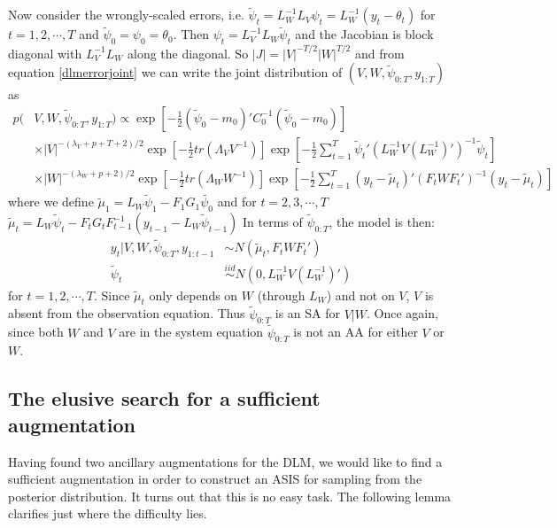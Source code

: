 \documentclass{article}
\begin{document}
Now consider the wrongly-scaled errors, i.e. $\tilde{\psi}_t=L_W^{-1}L_V\psi_t=L_W^{-1}(y_t - \theta_t)$ for $t=1,2,\cdots,T$ and $\tilde{\psi}_0=\psi_0=\theta_0$. Then $\psi_t = L_V^{-1}L_W\tilde{\psi}_t$ and the Jacobian is block diagonal with $L_V^{-1}L_W$ along the diagonal. So $|J|=|V|^{-T/2}|W|^{T/2}$ and from equation \eqref{dlmerrorjoint} we can write the joint distribution of $(V, W, \tilde{\psi}_{0:T}, y_{1:T})$ as
\begin{align}
    p(&V,W,\tilde{\psi}_{0:T},y_{1:T}) \propto \exp\left[-\frac{1}{2}(\tilde{\psi}_0-m_0)'C_0^{-1}(\tilde{\psi}_0-m_0)\right] \nonumber\\
   &\times |V|^{-(\lambda_V + p + T + 2)/2}\exp\left[-\frac{1}{2}tr\left(\Lambda_VV^{-1}\right)\right] \exp\left[-\frac{1}{2}\sum_{t=1}^T\tilde{\psi}_t'(L_W^{-1}V(L_W^{-1})')^{-1}\tilde{\psi}_t\right] \nonumber\\
    & \times |W|^{-(\lambda_W + p + 2)/2}\exp\left[-\frac{1}{2}tr\left(\Lambda_WW^{-1}\right)\right]\exp\left[-\frac{1}{2}\sum_{t=1}^T(y_t - \tilde{\mu}_t)'(F_tWF_t')^{-1}(y_t-\tilde{\mu}_t)\right]\label{dlmerrortildejoint}
 \end{align}
where we define $\tilde{\mu}_1 = L_W\tilde{\psi}_1 - F_1G_1\tilde{\psi_0}$ and for $t=2,3,\cdots,T$ $\tilde{\mu}_t =L_W\tilde{\psi}_t - F_tG_tF_{t-1}^{-1}(y_{t-1} - L_{W}\tilde{\psi}_{t-1})$ In terms of $\tilde{\psi}_{0:T}$, the model is then:
 \begin{align*}
   y_t|V,W,\tilde{\psi}_{0:T},y_{1:t-1} &\sim N(\tilde{\mu}_t, F_tWF_t')\\
   \tilde{\psi}_t & \stackrel{iid}{\sim} N(0,L_W^{-1}V(L_W^{-1})')
\end{align*}
for $t=1,2,\cdots,T$. Since $\tilde{\mu}_t$ only depends on $W$ (through $L_W$) and not on $V$, $V$ is absent from the observation equation. Thus $\tilde{\psi}_{0:T}$ is an SA for $V|W$. Once again, since both $W$ and $V$ are in the system equation $\tilde{\psi}_{0:T}$ is not an AA for either $V$ or $W$.

\subsection{The elusive search for a sufficient augmentation}

Having found two ancillary augmentations for the DLM, we would like to find a sufficient augmentation in order to construct an ASIS for sampling from the posterior distribution. It turns out that this is no easy task. The following lemma clarifies just where the difficulty lies.
\end{document}

